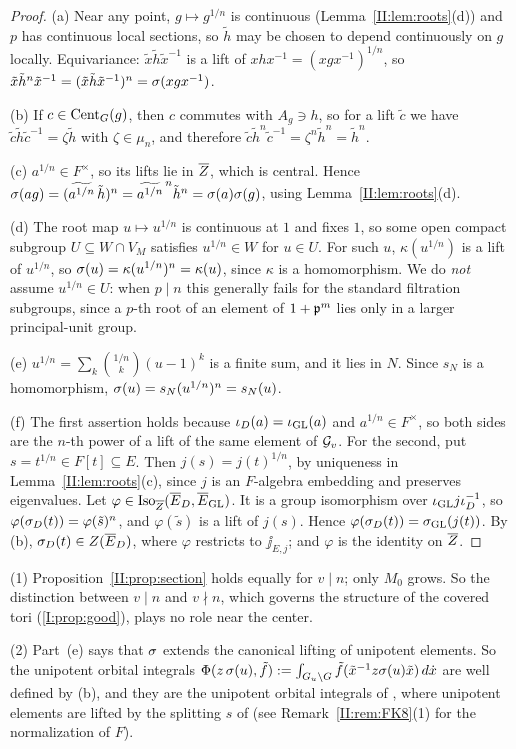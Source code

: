 \begin{proof}
(a) Near any point, $g\mapsto g^{1/n}$ is continuous (Lemma~\ref{II:lem:roots}(d)) and $p$ has continuous local sections, so $\tilde h$ may be chosen to depend continuously on $g$ locally. Equivariance: $\tilde x\tilde h\tilde x^{-1}$ is a lift of $xhx^{-1}=(xgx^{-1})^{1/n}$, so $\tilde x\tilde h^n\tilde x^{-1}=(\tilde x\tilde h\tilde x^{-1})^n=\sigma(xgx^{-1})$.

(b) If $c\in\operatorname{Cent}_G(g)$, then $c$ commutes with $A_g\ni h$, so for a lift $\tilde c$ we have $\tilde c\tilde h\tilde c^{-1}=\zeta\tilde h$ with $\zeta\in\mu_n$, and therefore $\tilde c\tilde h^n\tilde c^{-1}=\zeta^n\tilde h^n=\tilde h^n$.

(c) $a^{1/n}\in F^\times$, so its lifts lie in $\overline{Z}$, which is central. Hence $\sigma(ag)=(\widetilde{a^{1/n}}\,\tilde h)^n=\widetilde{a^{1/n}}^{\,n}\tilde h^n=\sigma(a)\sigma(g)$, using Lemma~\ref{II:lem:roots}(d).

(d) The root map $u\mapsto u^{1/n}$ is continuous at $1$ and fixes $1$, so some open compact subgroup $U\subseteq W\cap V_M$ satisfies $u^{1/n}\in W$ for $u\in U$. For such $u$, $\kappa(u^{1/n})$ is a lift of $u^{1/n}$, so $\sigma(u)=\kappa(u^{1/n})^n=\kappa(u)$, since $\kappa$ is a homomorphism. We do \emph{not} assume $u^{1/n}\in U$: when $p\mid n$ this generally fails for the standard filtration subgroups, since a $p$-th root of an element of $1+\mathfrak{p}^m$ lies only in a larger principal-unit group.

(e) $u^{1/n}=\sum_k\binom{1/n}{k}(u-1)^k$ is a finite sum, and it lies in $N$. Since $s_N$ is a homomorphism, $\sigma(u)=s_N(u^{1/n})^n=s_N(u)$.

(f) The first assertion holds because $\iota_D(a)=\iota_{\mathrm{GL}}(a)$ and $a^{1/n}\in F^\times$, so both sides are the $n$-th power of a lift of the same element of $\mathcal{G}_v$. For the second, put $s=t^{1/n}\in F[t]\subseteq E$. Then $j(s)=j(t)^{1/n}$, by uniqueness in Lemma~\ref{II:lem:roots}(c), since $j$ is an $F$-algebra embedding and preserves eigenvalues. Let $\varphi\in\operatorname{Iso}_{\overline{Z}}(\overline{E}_D,\overline{E}_{\mathrm{GL}})$. It is a group isomorphism over $\iota_{\mathrm{GL}} j\iota_D^{-1}$, so $\varphi(\sigma_D(t))=\varphi(\tilde s)^n$, and $\varphi(\tilde s)$ is a lift of $j(s)$. Hence $\varphi(\sigma_D(t))=\sigma_{\mathrm{GL}}(j(t))$. By (b), $\sigma_D(t)\in Z(\overline{E}_D)$, where $\varphi$ restricts to $\jj_{E,j}$; and $\varphi$ is the identity on $\overline{Z}$.
\end{proof}

\begin{remark}
(1) Proposition~\ref{II:prop:section} holds equally for $v\mid n$; only $M_0$ grows. So the distinction between $v\mid n$ and $v\nmid n$, which governs the structure of the covered tori (\cref{I:prop:good}), plays no role near the center.

(2) Part~(e) says that $\sigma$ extends the canonical lifting of unipotent elements. So the unipotent orbital integrals $\Phi(z\,\sigma(u),\tilde f):=\int_{G_u\backslash G}\tilde f(\tilde x^{-1}z\sigma(u)\tilde x)\,d\dot x$ are well defined by (b), and they are the unipotent orbital integrals of \cite[\S8]{FK86}, where unipotent elements are lifted by the splitting $s$ of \cite[\S2]{FK86} (see Remark~\ref{II:rem:FK8}(1) for the normalization of $F$).
\end{remark}


